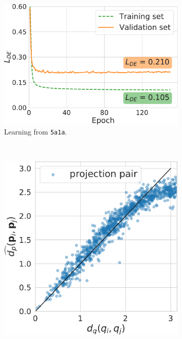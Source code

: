\begin{figure}
\begin{minipage}[b]{0.45\linewidth}
\begin{subfigure}[b]{0.47\linewidth}
        \end{subfigure}
        \hfill
        \begin{subfigure}[b]{0.47\linewidth}
            \centering
            \includegraphics[width=\linewidth]{figures/de_5a1a.pdf}
            \caption{Learning from \texttt{5a1a}.\vspace{0.5em}}
        \end{subfigure}
        \\ %
        \begin{subfigure}[b]{0.47\linewidth}
            \centering
            \includegraphics[width=\linewidth]{figures/dPdQ_5j0n.pdf}

\end{subfigure}
\end{minipage}
\end{figure}

